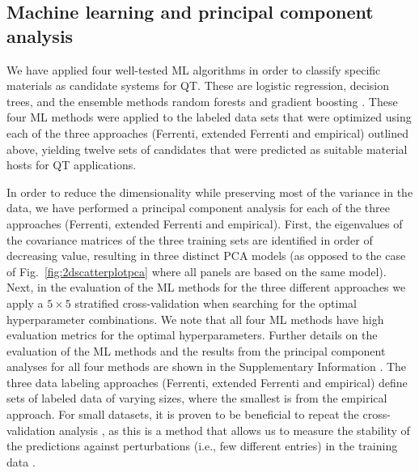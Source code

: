 \documentclass[superscriptaddress,unsortedaddress,
 amsmath,amssymb,
 aps,
]{revtex4-2}
\begin{document}

\subsection*{Machine learning and principal component analysis}
We have applied four well-tested ML algorithms in order to classify specific materials as candidate systems for QT. These are logistic regression, decision trees, and the ensemble methods random forests and gradient boosting \cite{Mehta2019,Hastie2009,Murphy2012}. 
These four ML methods were applied to the labeled data sets that were optimized using each of the three approaches (Ferrenti, extended Ferrenti and empirical) outlined above, yielding twelve sets of candidates that were predicted as suitable material hosts for QT applications.  

In order to reduce the dimensionality while preserving most of the variance in the data, 
we have performed a principal component analysis  \cite{Jolliffe2002} for each of the three approaches (Ferrenti, extended Ferrenti and empirical).
First, the eigenvalues of the covariance matrices of the three training sets are identified in order of decreasing value, resulting in three distinct PCA models (as opposed to the case of Fig.~\ref{fig:2dscatterplotpca} where all panels are based on the same model). 
Next, in the evaluation of the ML methods for the three different approaches we apply a $5\times 5$ stratified cross-validation \cite{Hastie2009} when searching for the optimal hyperparameter combinations. We note that all four ML methods have high evaluation metrics for the optimal hyperparameters. Further details on the evaluation of the ML methods and the results from the principal component analyses for all four methods are shown in the Supplementary Information \cite{supplementary}.  
The three data labeling approaches (Ferrenti, extended Ferrenti and empirical) define sets of labeled data of varying sizes, where the smallest is from the empirical approach. For small datasets, it is proven to be beneficial to repeat the cross-validation analysis \cite{Hastie2009}, as this is a method that allows us to measure the stability of the predictions against perturbations (i.e., few different entries) in the training data \cite{Beleites2008}.
\end{document}
